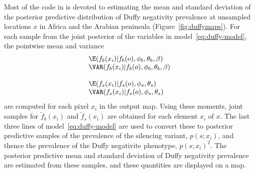 \documentclass[article]{jss}
\begin{document}
\bigskip
Most of the code in  is devoted to estimating the mean and standard deviation of the posterior predictive distribution of Duffy negativity prevalence at unsampled locations $x$ in Africa and the Arabian peninsula (Figure~\ref{fig:duffymaps}). For each sample from the joint posterior of the variables in model~\ref{eq:duffy-model}, 
the pointwise mean and variance 
\begin{equation}
    \label{eq:map-moments} 
    \begin{array}{l}
        \E(f_b(x_i)|f_b(o), \phi_b, \theta_b, \beta)\\
        \VAR(f_b(x_i)|f_b(o), \phi_b, \theta_b, \beta)\\\\
        \E(f_s(x_i)|f_s(o), \phi_s, \theta_s)\\
        \VAR(f_s(x_i)|f_s(o), \phi_s, \theta_s)
    \end{array}
\end{equation}
are computed for each pixel $x_i$ in the output map. Using these moments, joint samples for $\tilde f_b(x_i)$ and $\tilde f_s(x_i)$ are obtained for each element $x_i$ of $x$. The last three lines of model~\ref{eq:duffy-model} are used to convert these to posterior predictive samples of the prevalence of the silencing variant, $p(s;x_i)$, and thence the prevalence of the Duffy negativite phenotype, $p(s;x_i)^2$. The posterior predictive mean and standard deviation of Duffy negativity prevalence are estimated from these samples, and these quantities are displayed on a map.
\end{document}
